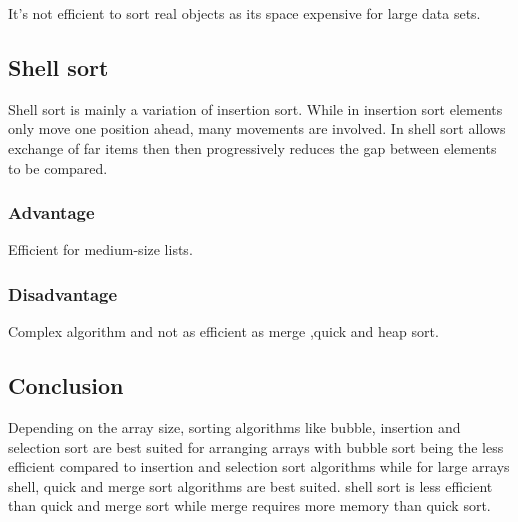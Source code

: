 \documentclass{article}
\begin{document}
	It's not efficient to sort real objects as its space expensive for large data sets.
	
\subsection{Shell sort}
	Shell sort is mainly a variation of insertion sort. While in insertion sort elements only move one position ahead, many movements are involved. In shell sort allows exchange of far items then then progressively reduces the gap between elements to be compared.
	
\subsubsection{Advantage}
	Efficient for medium-size lists.

\subsubsection{Disadvantage}
	Complex algorithm and not as efficient as merge ,quick and heap sort.
	
\subsection{Conclusion}
	Depending on the array size, sorting algorithms like bubble, insertion and selection sort are best suited for arranging arrays with bubble sort being the less efficient compared to insertion and selection sort algorithms while for large arrays shell, quick and merge sort algorithms are best suited. shell sort is less efficient than quick and merge sort while merge requires more memory than quick sort.
	
\end{document}
